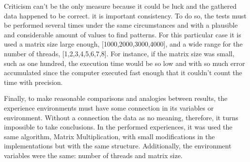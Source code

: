 Criticism can't be the only measure because it could be luck and the gathered data happened to be correct. it is important consistency. To do so, the tests must be performed several times under the same circumstances and with a plausible and  considerable amount of values to find patterns. For this particular case  it is used a matrix size large enough, [1000,2000,3000,4000], and a wide range for the number of threads, [1,2,3,4,5,6,7,8]. For instance, if the matrix size was small, such as one hundred, the execution time would be so low and with so much error accumulated since the computer executed fast enough that it couldn't count the time with precision. 

Finally, to make reasonable comparisons and analogies between results, the experience environments must have some connection in its variables or environment. Without a connection the data as no meaning, therefore, it turns impossible to take conclusions. In the performed experiences, it was used the same algorithm, Matrix Multiplication, with small modifications in the implementations but with the same structure. Additionally, the environment variables were the same: number of threads and matrix size.

  

